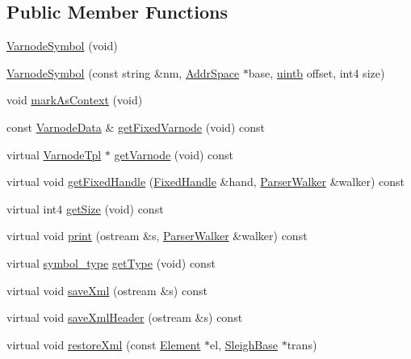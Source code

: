 \subsection*{Public Member Functions}
\begin{DoxyCompactItemize}
\item 
\mbox{\hyperlink{class_varnode_symbol_aaab06d6ee9596372c4a0760af6ef422a}{Varnode\+Symbol}} (void)
\item 
\mbox{\hyperlink{class_varnode_symbol_a60841906e74dd82c1df97982912ddc77}{Varnode\+Symbol}} (const string \&nm, \mbox{\hyperlink{class_addr_space}{Addr\+Space}} $\ast$base, \mbox{\hyperlink{types_8h_a2db313c5d32a12b01d26ac9b3bca178f}{uintb}} offset, int4 size)
\item 
void \mbox{\hyperlink{class_varnode_symbol_a247dfc7a93f9da6491c457f3fbe097e9}{mark\+As\+Context}} (void)
\item 
const \mbox{\hyperlink{struct_varnode_data}{Varnode\+Data}} \& \mbox{\hyperlink{class_varnode_symbol_a4552dee5d466cadd34766d38fd804c8e}{get\+Fixed\+Varnode}} (void) const
\item 
virtual \mbox{\hyperlink{class_varnode_tpl}{Varnode\+Tpl}} $\ast$ \mbox{\hyperlink{class_varnode_symbol_aae6d99071fdc4ac8e55d78845898669f}{get\+Varnode}} (void) const
\item 
virtual void \mbox{\hyperlink{class_varnode_symbol_a11a3571821d8d4092798d3cc62d925ee}{get\+Fixed\+Handle}} (\mbox{\hyperlink{struct_fixed_handle}{Fixed\+Handle}} \&hand, \mbox{\hyperlink{class_parser_walker}{Parser\+Walker}} \&walker) const
\item 
virtual int4 \mbox{\hyperlink{class_varnode_symbol_a3e37b8884d830c54656a43e6b2e1712b}{get\+Size}} (void) const
\item 
virtual void \mbox{\hyperlink{class_varnode_symbol_a10b765544964a8f2b84072676fc945ff}{print}} (ostream \&s, \mbox{\hyperlink{class_parser_walker}{Parser\+Walker}} \&walker) const
\item 
virtual \mbox{\hyperlink{class_sleigh_symbol_aba70f7f332fd63488c5ec4bd7807db41}{symbol\+\_\+type}} \mbox{\hyperlink{class_varnode_symbol_a15662a0fcf1825811b7729bee1a5a2a5}{get\+Type}} (void) const
\item 
virtual void \mbox{\hyperlink{class_varnode_symbol_aed153df5b4c3fdb8c04bf422e2ea329b}{save\+Xml}} (ostream \&s) const
\item 
virtual void \mbox{\hyperlink{class_varnode_symbol_a897bc5a3be293e1067070b26eb5fa14b}{save\+Xml\+Header}} (ostream \&s) const
\item 
virtual void \mbox{\hyperlink{class_varnode_symbol_a9d0f7e98d0425e26ca4eddf002f1e471}{restore\+Xml}} (const \mbox{\hyperlink{class_element}{Element}} $\ast$el, \mbox{\hyperlink{class_sleigh_base}{Sleigh\+Base}} $\ast$trans)
\end{DoxyCompactItemize}
